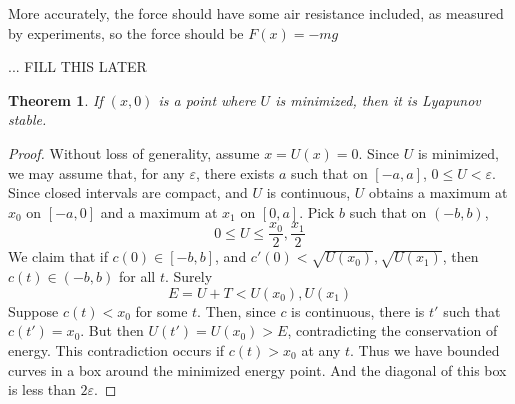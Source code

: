 \documentclass{article}
\newtheorem{theorem}{Theorem}
\begin{document}
More accurately, the force should have some air resistance included, as
measured by experiments, so the force should be $F(x) = -mg $

... FILL THIS LATER

\begin{theorem}
    If $(x,0)$ is a point where $U$ is minimized, then it is Lyapunov stable.
\end{theorem}
\begin{proof}
    Without loss of generality, assume $x = U(x) = 0$. Since $U$ is minimized, we may assume that, for any $\varepsilon$, there exists $a$ such that on $[-a,a]$, $0 \leq U < \varepsilon$. Since closed intervals are compact, and $U$ is continuous, $U$ obtains a maximum at $x_0$ on $[-a,0]$ and a maximum at $x_1$ on $[0,a]$. Pick $b$ such that on $(-b,b)$,
    \[ 0 \leq U \leq \frac{x_0}{2},\frac{x_1}{2} \]
    We claim that if $c(0) \in [-b,b]$, and $c'(0) < \sqrt{U(x_0)}, \sqrt{U(x_1)}$, then $c(t) \in (-b,b)$ for all $t$. Surely
    \[ E = U + T < U(x_0), U(x_1) \]
    Suppose $c(t) < x_0$ for some $t$. Then, since $c$ is continuous, there is $t'$ such that $c(t') = x_0$. But then $U(t') = U(x_0) > E$, contradicting the conservation of energy. This contradiction occurs if $c(t) > x_0$ at any $t$. Thus we have bounded curves in a box around the minimized energy point. And the diagonal of this box is less than $2\varepsilon$.
\end{proof}
\end{document}
